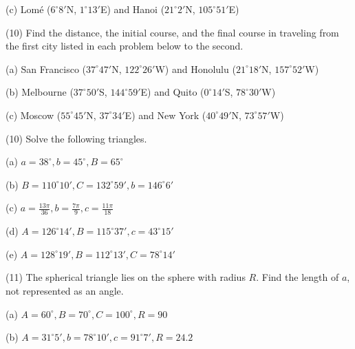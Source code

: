 \documentclass[11pt]{article}
\begin{document}
(c) Lom{\'e} ($6^{\circ}8'$N, $1^{\circ}13'$E) and Hanoi
($21^{\circ}2'$N, $105^{\circ}51'$E)

(10) Find the distance, the initial course, and the final course in
traveling from the first city listed in each problem below to the
second.

(a) San Francisco ($37^{\circ}47'$N, $122^{\circ}26'$W) and Honolulu
($21^{\circ}18'$N, $157^{\circ}52'$W)

(b) Melbourne ($37^{\circ}50'$S, $144^{\circ}59'$E) and Quito
($0^{\circ}14'$S, $78^{\circ}30'$W)

(c) Moscow ($55^{\circ}45'$N, $37^{\circ}34'$E) and New York
($40^{\circ}49'$N, $73^{\circ}57'$W)

(10) Solve the following triangles. 

(a) $a=38^{\circ},b=45^{\circ},B=65^{\circ}$

(b) $B=110^{\circ}10',C=132^{\circ}59',b=146^{\circ}6'$

(c) $a=\frac{13\pi}{36},b=\frac{7\pi}{9},c=\frac{11\pi}{18}$

(d) $A=126^{\circ}14',B=115^{\circ}37',c=43^{\circ}15'$

(e) $A=128^{\circ}19',B=112^{\circ}13',C=78^{\circ}14'$

(11) The spherical triangle lies on the sphere with radius $R$. Find
the length of $a$, not represented as an angle.

(a) $A=60^{\circ},B=70^{\circ},C=100^{\circ},R=90$

(b) $A=31^{\circ}5',b=78^{\circ}10',c=91^{\circ}7',R=24.2$
\end{document}
